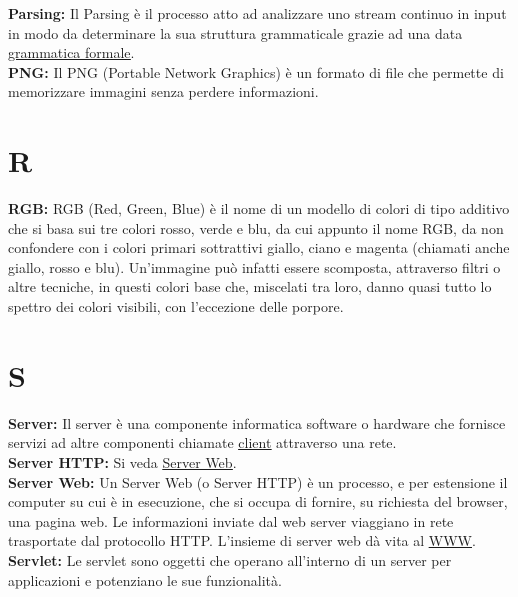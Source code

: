 \hypertarget{parsing}{}
\textbf{Parsing:}
Il Parsing \` e il processo atto ad analizzare uno stream continuo in input in modo da determinare la sua struttura grammaticale grazie ad una data \hyperlink{grmfrm}{\underline{grammatica formale}}.\\

\hypertarget{png}{}
\textbf{PNG:}
Il PNG (Portable Network Graphics) \`e un formato di file che permette di memorizzare immagini senza perdere informazioni.\\

\section*{R}
\hypertarget{rgb}{}
\textbf{RGB:}
RGB (Red, Green, Blue) \`e  il nome di un modello di colori di tipo additivo che si basa sui tre colori rosso, verde e blu, da cui appunto il nome RGB, da non confondere con i colori primari sottrattivi giallo, ciano e magenta (chiamati anche giallo, rosso e blu).
Un'immagine pu\`o  infatti essere scomposta, attraverso filtri o altre tecniche, in questi colori base che, miscelati tra loro, danno quasi tutto lo spettro dei colori visibili, con l'eccezione delle porpore.\\

\section*{S}
\hypertarget{server}{}
\textbf{Server:}
Il server \`e una componente informatica software o hardware che fornisce servizi ad altre componenti chiamate \hyperlink{client}{\underline{client}} attraverso una rete. \\

\hypertarget{serverhttp}{}
\textbf{Server HTTP:}
Si veda \hyperlink{serverweb}{\underline{Server Web}}.\\

\hypertarget{serverweb}{}
\textbf{Server Web:}
Un Server Web (o Server HTTP) \` e un processo, e per estensione il computer su cui \` e in esecuzione, che si occupa di fornire, su richiesta del browser, una pagina web. Le informazioni inviate dal web server viaggiano in rete trasportate dal protocollo HTTP. L'insieme di server web d\` a vita al \hyperlink{www}{\underline{WWW}}.\\ 

\hypertarget{servlet}{}
\textbf{Servlet:}
Le servlet sono oggetti che operano all'interno di un server per applicazioni e potenziano le sue funzionalit\` a.\\

